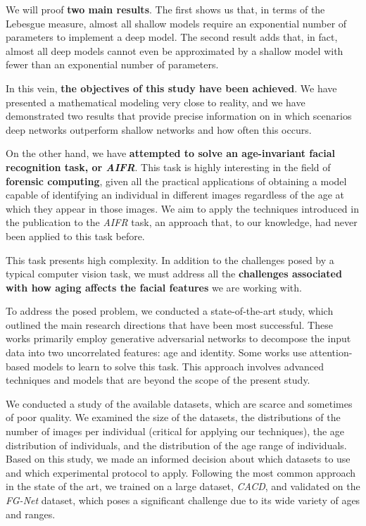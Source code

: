 We will proof \textbf{two main results}. The first shows us that, in terms of the Lebesgue measure, almost all shallow models require an exponential number of parameters to implement a deep model. The second result adds that, in fact, almost all deep models cannot even be approximated by a shallow model with fewer than an exponential number of parameters.

In this vein, \textbf{the objectives of this study have been achieved}. We have presented a mathematical modeling very close to reality, and we have demonstrated two results that provide precise information on in which scenarios deep networks outperform shallow networks and how often this occurs.

On the other hand, we have \textbf{attempted to solve an age-invariant facial recognition task, or \textit{AIFR}}. This task is highly interesting in the field of \textbf{forensic computing}, given all the practical applications of obtaining a model capable of identifying an individual in different images regardless of the age at which they appear in those images. We aim to apply the techniques introduced in the publication \cite{informatica:principal} to the \textit{AIFR} task, an approach that, to our knowledge, had never been applied to this task before.

This task presents high complexity. In addition to the challenges posed by a typical computer vision task, we must address all the \textbf{challenges associated with how aging affects the facial features} we are working with.

To address the posed problem, we conducted a state-of-the-art study, which outlined the main research directions that have been most successful. These works primarily employ generative adversarial networks to decompose the input data into two uncorrelated features: age and identity. Some works use attention-based models to learn to solve this task. This approach involves advanced techniques and models that are beyond the scope of the present study.

We conducted a study of the available datasets, which are scarce and sometimes of poor quality. We examined the size of the datasets, the distributions of the number of images per individual (critical for applying our techniques), the age distribution of individuals, and the distribution of the age range of individuals. Based on this study, we made an informed decision about which datasets to use and which experimental protocol to apply. Following the most common approach in the state of the art, we trained on a large dataset, \textit{CACD}, and validated on the \textit{FG-Net} dataset, which poses a significant challenge due to its wide variety of ages and ranges.

